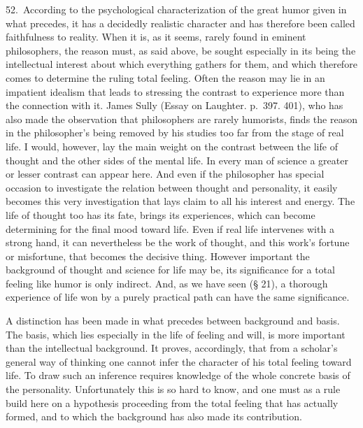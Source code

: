 \documentclass[12pt]{book}
\newcommand{\opage}[1]{\marginnote{\footnotesize\textit{[#1]}}}
\begin{document}
52.~According to the psychological characterization of the great humor given in what precedes, it
has a decidedly realistic character and has therefore been called faithfulness to reality. When it
is, as it seems, rarely found in eminent philosophers, the reason must, as said above, be sought
especially in its being the intellectual interest about which everything gathers for them, and
which therefore comes to determine the ruling total feeling. Often the reason may lie in an
impatient idealism that leads to stressing the contrast to experience more than the connection
with it. James Sully (Essay on Laughter. p.~397. 401), who has also made the observation that
philosophers are rarely humorists, finds the reason in the philosopher's being removed by his
studies too \opage{168}far from the stage of real life. I would, however, lay the main weight on
the contrast between the life of thought and the other sides of the mental life. In every man of
science a greater or lesser contrast can appear here. And even if the philosopher has special
occasion to investigate the relation between thought and personality, it easily becomes this very
investigation that lays claim to all his interest and energy. The life of thought too has its
fate, brings its experiences, which can become determining for the final mood toward life. Even if
real life intervenes with a strong hand, it can nevertheless be the work of thought, and this
work's fortune or misfortune, that becomes the decisive thing. However important the background of
thought and science for life may be, its significance for a total feeling like humor is only
indirect. And, as we have seen (§ 21), a thorough experience of life won by a purely practical path
can have the same significance.

A distinction has been made in what precedes between background and basis. The basis, which lies
especially in the life of feeling and will, is more important than the intellectual background. It
proves, accordingly, that from a scholar's general way of thinking one cannot infer the character
of his total feeling toward life. To draw such an inference requires knowledge of the whole concrete
basis of the personality. Unfortunately this is so hard to know, and one must as a rule build here
on a hypothesis proceeding from the total feeling that has actually formed, and to which the
background has also made its contribution.
\end{document}
